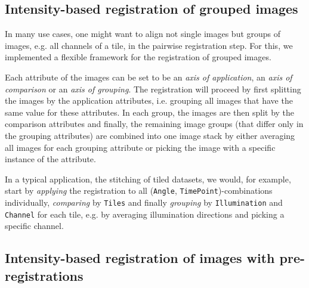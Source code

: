 \subsection*{Intensity-based registration of grouped images}

In many use cases, one might want to align not single images but groups of images, e.g. all channels of a tile, in the pairwise registration step. For this, we implemented a flexible framework for the registration of grouped images.

Each attribute of the images can be set to be an \emph{axis of application}, an \emph{axis of comparison} or an \emph{axis of grouping}. The registration will proceed by first splitting the images by the application attributes, i.e. grouping all images that have the same value for these attributes. In each group, the images are then split by the comparison attributes and finally, the remaining image groups (that differ only in the grouping attributes) are combined into one image stack by either averaging all images for each grouping attribute or picking the image with a specific instance of the attribute.   

In a typical application, the stitching of tiled datasets, we would, for example, start by \emph{applying} the registration to all (\texttt{Angle}, \texttt{TimePoint})-combinations individually, \emph{comparing} by \texttt{Tiles} and finally \emph{grouping} by \texttt{Illumination} and \texttt{Channel} for each tile, e.g. by averaging illumination directions and picking a specific channel.

\subsection*{Intensity-based registration of images with pre-registrations}

